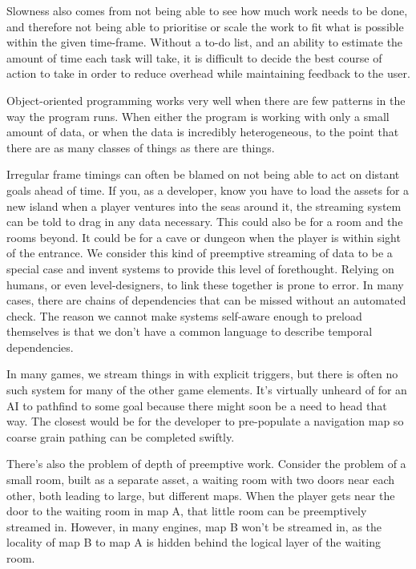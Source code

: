 \documentclass[a4paper,12pt]{book}
\begin{document}
Slowness also comes from not being able to see how much work needs to be done, and therefore not being able to prioritise or scale the work to fit what is possible within the given time-frame.
Without a to-do list, and an ability to estimate the amount of time each task will take, it is difficult to decide the best course of action to take in order to reduce overhead while maintaining feedback to the user.

Object-oriented programming works very well when there are few patterns in the way the program runs.
When either the program is working with only a small amount of data, or when the data is incredibly heterogeneous, to the point that there are as many classes of things as there are things.

Irregular frame timings can often be blamed on not being able to act on distant goals ahead of time.
If you, as a developer, know you have to load the assets for a new island when a player ventures into the seas around it, the streaming system can be told to drag in any data necessary.
This could also be for a room and the rooms beyond.
It could be for a cave or dungeon when the player is within sight of the entrance.
We consider this kind of preemptive streaming of data to be a special case and invent systems to provide this level of forethought.
Relying on humans, or even level-designers, to link these together is prone to error.
In many cases, there are chains of dependencies that can be missed without an automated check.
The reason we cannot make systems self-aware enough to preload themselves is that we don't have a common language to describe temporal dependencies.

In many games, we stream things in with explicit triggers, but there is often no such system for many of the other game elements.
It's virtually unheard of for an AI to pathfind to some goal because there might soon be a need to head that way.
The closest would be for the developer to pre-populate a navigation map so coarse grain pathing can be completed swiftly.

There's also the problem of depth of preemptive work.
Consider the problem of a small room, built as a separate asset, a waiting room with two doors near each other, both leading to large, but different maps.
When the player gets near the door to the waiting room in map A, that little room can be preemptively streamed in.
However, in many engines, map B won't be streamed in, as the locality of map B to map A is hidden behind the logical layer of the waiting room.
\end{document}
